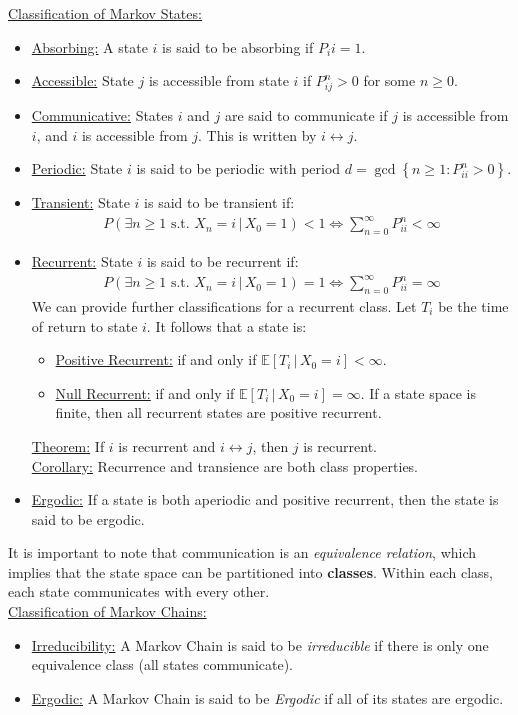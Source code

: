 \documentclass{article}
\newcommand{\sheader}[1]{\underline{#1:}}
\newcommand{\gap}{\medskip\\}
\newcommand{\curly}[1]{\left\{#1\right\}}
\begin{document}
\sheader{Classification of Markov States}
\begin{itemize}
    \item \sheader{Absorbing} A state $i$ is said to be absorbing if 
    $P_ii = 1$.
    \item \sheader{Accessible} State $j$ is accessible from state $i$
    if $P_{ij}^n > 0$ for some $n \geq 0$.
    \item \sheader{Communicative} States $i$ and $j$ are said to communicate 
    if $j$ is accessible from $i$, and $i$ is accessible from $j$. This 
    is written by $i \leftrightarrow j$.
    \item \sheader{Periodic} State $i$ is said to be periodic with 
    period $d = \gcd\curly{n \geq 1: P_{ii}^n > 0}$.
    \item \sheader{Transient} State $i$ is said to be transient if:
    \begin{align*}
        P(\exists n \geq 1 \textrm{ s.t. } X_n = i \,|\, X_0 = 1) < 1 \iff \sum_{n=0}^{\infty} P_{ii}^n < \infty
    \end{align*}
    \item \sheader{Recurrent} State $i$ is said to be recurrent if:
    \begin{align*}
        P(\exists n \geq 1 \textrm{ s.t. } X_n = i \,|\, X_0 = 1) = 1 \iff \sum_{n=0}^{\infty} P_{ii}^n = \infty
    \end{align*}
    We can provide further classifications for a recurrent class.
    Let $T_i$ be the time of return to state $i$. It follows that a state is:
    \begin{itemize}
        \item \sheader{Positive Recurrent} if and only if $\mathbb{E}\left[T_i \,|\, X_0=i\right] < \infty$.
        \item \sheader{Null Recurrent} if and only if $\mathbb{E}\left[T_i \,|\, X_0 =i\right] = \infty$.
        If a state space is finite, then all recurrent states are positive recurrent.
    \end{itemize}
    \sheader{Theorem} If $i$ is recurrent and $i \leftrightarrow j$, then $j$
    is recurrent.
    \gap
    \sheader{Corollary} Recurrence and transience are both class properties.
    \item \sheader{Ergodic} If a state is both aperiodic and positive 
    recurrent, then the state is said to be ergodic.
\end{itemize}
It is important to note that communication is an \textit{equivalence relation},
which implies that the state space can be partitioned into \textbf{classes}.
Within each class, each state communicates with every other. 
\gap 
\sheader{Classification of Markov Chains}
\begin{itemize}
    \item \sheader{Irreducibility} A Markov Chain is said to be \textit{irreducible}
    if there is only one equivalence class (all states communicate).
    \item \sheader{Ergodic} A Markov Chain is said to be \textit{Ergodic} 
    if all of its states are ergodic.
\end{itemize}
\end{document}
